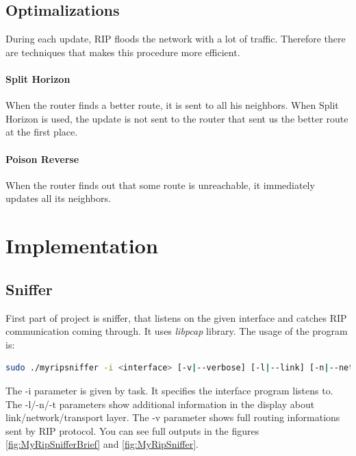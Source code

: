 \documentclass[10pt,a4paper,titlepage]{article}
\begin{document}
        \subsection{Optimalizations}
            During each update, RIP floods the network with a lot of traffic. Therefore there are techniques that makes this procedure
            more efficient.
            \paragraph{Split Horizon}
                When the router finds a better route, it is sent to all his neighbors. When Split Horizon is used, the update is
                not sent to the router that sent us the better route at the first place.
            \paragraph{Poison Reverse} 
                When the router finds out that some route is unreachable, it immediately updates all its neighbors. \cite{RIPJuniper}
                \cite{RIPGuide} \cite{RIPWikipedia} \cite{computernetworking} \cite{mistrovstvivsitich}
    
    \newpage
    \section{Implementation}

        \subsection{Sniffer}
            First part of project is sniffer, that listens on the given interface and catches RIP communication coming through.
            It uses {\it libpcap} library. The usage of the program is:
            \begin{lstlisting}[language=sh, basicstyle=\tiny]
sudo ./myripsniffer -i <interface> [-v|--verbose] [-l|--link] [-n|--network] [-t|--transport]
            \end{lstlisting}

            The -i parameter is given by task. It specifies the interface program listens to. The -l/-n/-t parameters show
            additional information in the display about link/network/transport layer. The -v parameter shows full routing
            informations sent by RIP protocol. You can see full outputs in the figures \ref{fig:MyRipSnifferBrief} and \ref{fig:MyRipSniffer}.
\end{document}
